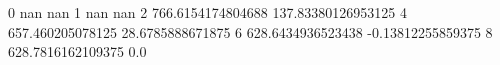 0 nan nan
1 nan nan
2 766.6154174804688 137.83380126953125
4 657.460205078125 28.6785888671875
6 628.6434936523438 -0.13812255859375
8 628.7816162109375 0.0
